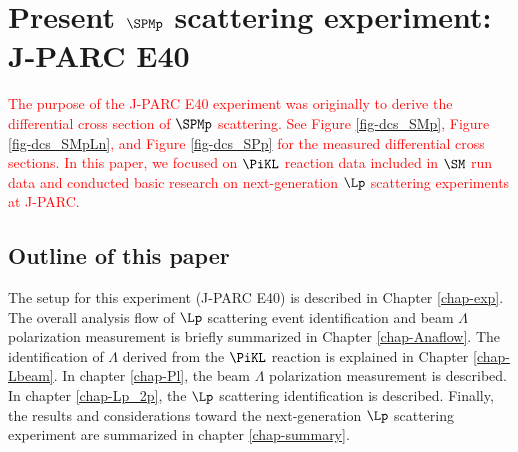 \clearpage
\section{Present $\SPMp$ scattering experiment: \\J-PARC E40}
\textcolor{red}{The purpose of the J-PARC E40 experiment was originally to derive the differential cross section of $\SPMp$ scattering. See Figure \ref{fig-dcs_SMp}, Figure \ref{fig-dcs_SMpLn}, and Figure \ref{fig-dcs_SPp} for the measured differential cross sections. In this paper, we focused on $\PiKL$ reaction data included in $\SM$ run data and conducted basic research on next-generation $\Lp$ scattering experiments at J-PARC.}

\subsection{Outline of this paper}
The setup for this experiment (J-PARC E40) is described in Chapter \ref{chap-exp}. The overall analysis flow of $\Lp$ scattering event identification and beam $\Lambda$ polarization measurement is briefly summarized in Chapter \ref{chap-Anaflow}. The identification of $\Lambda$ derived from the $\PiKL$ reaction is explained in Chapter \ref{chap-Lbeam}. In chapter \ref{chap-Pl}, the beam $\Lambda$ polarization measurement is described. In chapter \ref{chap-Lp_2p}, the $\Lp$ scattering identification is described. Finally, the results and considerations toward the next-generation $\Lp$ scattering experiment are summarized in chapter \ref{chap-summary}.


